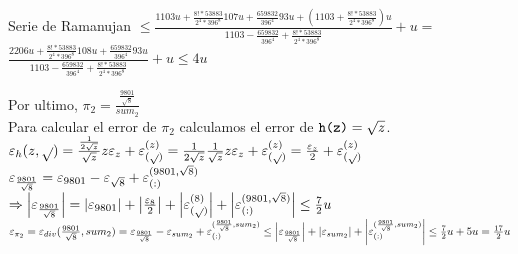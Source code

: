 \begin{subsection}{Serie de Ramanujan}
	$\leq \frac{1103u + \frac{8!*53883}{2^4*396^8}107u + \frac{659832}{396^4}93u + (1103+\frac{8!*53883}{2^4*396^8})u}{1103 - \frac{659832}{396^4} + \frac{8!*53883}{2^4*396^8}} + u =$\\
	
	$\frac{2206u + \frac{8!*53883}{2^4*396^8}108u + \frac{659832}{396^4}93u}{1103 - \frac{659832}{396^4} + \frac{8!*53883}{2^4*396^8}} + u \leq 4u$\\
	
	\pa
	
	Por ultimo, $\pi_2=\frac{\frac{9801}{\sqrt{8}}}{sum_2}$\\
	
	Para calcular el error de $\pi_2$ calculamos el error de $\texttt{h(z)}=\sqrt{z}$.\\
	
	$\varepsilon _{h}({z,\sqrt{ }}) = \frac{\frac{1}{2\sqrt{z}}}{\sqrt{z}}z\varepsilon _{z} + \varepsilon _{({\sqrt{ }})}^{({z})} = \frac{1}{2\sqrt{z}}\frac{1}{\sqrt{z}}z\varepsilon _{z} + \varepsilon _{({\sqrt{ }})}^{({z})} = \frac{\varepsilon _{z}}{2} + \varepsilon _{({\sqrt{ }})}^{({z})}$\\
	
	$\varepsilon _{\frac{9801}{\sqrt{8}}} = \varepsilon _{9801} - \varepsilon _{\sqrt{8}} + \varepsilon _{({:})}^{({9801,\sqrt{8}})}$\\
	$\Rightarrow \left|\varepsilon _{\frac{9801}{\sqrt{8}}}\right| = \left|\varepsilon _{9801}\right| + \left|\frac{\varepsilon _{8}}{2}\right| + \left|\varepsilon _{({\sqrt{ }})}^{({8})}\right| + \left|\varepsilon _{({:})}^{({9801,\sqrt{8}})}\right| \leq \frac{7}{2}u$\\
		
	$\varepsilon _{\pi_2} = \varepsilon _{div}({\frac{9801}{\sqrt{8}},sum_2}) = \varepsilon _{\frac{9801}{\sqrt{8}}} - \varepsilon _{sum_2} + \varepsilon _{({:})}^{({\frac{9801}{\sqrt{8}},sum_2})} \leq \left|\varepsilon _{\frac{9801}{\sqrt{8}}}\right| + \left|\varepsilon _{sum_2}\right| + \left|\varepsilon _{({:})}^{({\frac{9801}{\sqrt{8}},sum_2})}\right| \leq \frac{7}{2}u + 5u = \frac{17}{2}u$\\
		
\end{subsection}